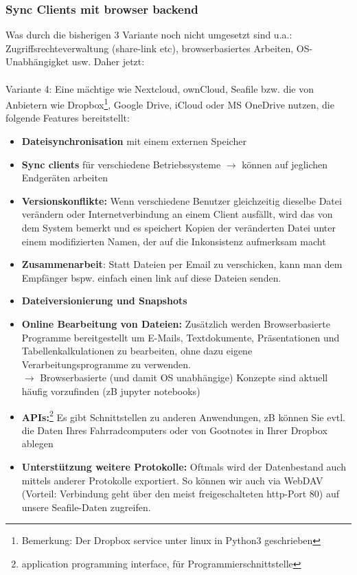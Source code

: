 \subsubsection{Sync Clients mit browser backend} \label{sec:syncclient}
Was durch die bisherigen 3 Variante noch nicht umgesetzt sind u.a.: Zugriffsrechteverwaltung (share-link etc), browserbasiertes Arbeiten, OS-Unabhängigket usw. Daher jetzt:
~\\~\\
Variante 4: Eine mächtige  wie Nextcloud, ownCloud, Seafile bzw. die von Anbietern wie Dropbox\footnote{Bemerkung: Der Dropbox service unter linux in Python3 geschrieben}, Google Drive, iCloud oder MS OneDrive nutzen, die folgende Features bereitstellt:
\begin{itemize}
	\item \textbf{Dateisynchronisation} mit einem externen Speicher
	\item \textbf{Sync clients} für verschiedene Betriebssysteme $\to$ können auf jeglichen Endgeräten arbeiten
	\item \textbf{Versionskonflikte:} Wenn verschiedene Benutzer gleichzeitig dieselbe Datei verändern oder Internetverbindung an einem Client ausfällt, wird das von
	dem System bemerkt und es speichert Kopien der veränderten Datei unter einem modifizierten Namen, der auf die Inkonsistenz aufmerksam macht
	\item \textbf{Zusammenarbeit}: Statt Dateien per Email zu verschicken, kann man dem Empfänger bspw. einfach einen link auf diese Dateien senden.
	\item \textbf{Dateiversionierung und Snapshots}
	\item \textbf{Online Bearbeitung von Dateien:}
	Zusätzlich werden Browserbasierte Programme bereitgestellt um E-Mails, Textdokumente, Präsentationen und
	Tabellenkalkulationen zu bearbeiten, ohne dazu eigene Verarbeitungsprogramme zu
	verwenden. \\
	$\to$ Browserbasierte (und damit OS unabhängige) Konzepte sind aktuell häufig vorzufinden (zB jupyter notebooks)
	\item \textbf{APIs:}\footnote{application programming interface, für Programmierschnittstelle} Es gibt Schnittstellen zu anderen Anwendungen, zB können Sie evtl. die Daten Ihres Fahrradcomputers oder von Gootnotes in Ihrer Dropbox ablegen
	\item \textbf{Unterstützung weitere Protokolle:} Oftmals wird der Datenbestand auch mittels anderer Protokolle exportiert. So können wir auch via WebDAV (Vorteil: Verbindung geht über den meist freigeschalteten http-Port 80) auf unsere Seafile-Daten zugreifen.
\end{itemize}
